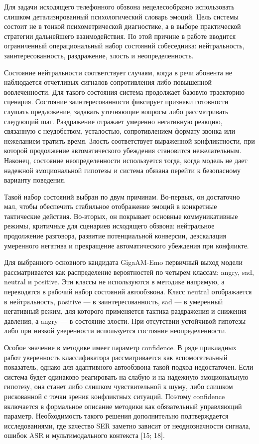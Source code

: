 \documentclass[a4paper,14pt]{extarticle}
\renewcommand{\texttt}[1]{\textnormal{#1}}
\begin{document}
Для задачи исходящего телефонного обзвона нецелесообразно использовать
слишком детализированный психологический словарь эмоций. Цель системы
состоит не в тонкой психометрической диагностике, а в выборе
практической стратегии дальнейшего взаимодействия. По этой причине в
работе вводится ограниченный операциональный набор состояний
собеседника: нейтральность, заинтересованность, раздражение, злость и
неопределенность.

Состояние нейтральности соответствует случаям, когда в речи абонента не
наблюдается отчетливых сигналов сопротивления либо повышенной
вовлеченности. Для такого состояния система продолжает базовую
траекторию сценария. Состояние заинтересованности фиксирует признаки
готовности слушать предложение, задавать уточняющие вопросы либо
рассматривать следующий шаг. Раздражение отражает умеренно негативную
реакцию, связанную с неудобством, усталостью, сопротивлением формату
звонка или нежеланием тратить время. Злость соответствует выраженной
конфликтности, при которой продолжение автоматического убеждения
становится нежелательным. Наконец, состояние неопределенности
используется тогда, когда модель не дает надежной эмоциональной гипотезы
и система обязана перейти к безопасному варианту поведения.

Такой набор состояний выбран по двум причинам. Во-первых, он достаточно
мал, чтобы обеспечить стабильное отображение эмоций в конкретные
тактические действия. Во-вторых, он покрывает основные коммуникативные
режимы, критичные для сценариев исходящего обзвона: нейтральное
продолжение разговора, развитие потенциальной конверсии, деэскалация
умеренного негатива и прекращение автоматического убеждения при
конфликте.

Для выбранного основного кандидата \texttt{GigaAM-Emo} первичный выход
модели рассматривается как распределение вероятностей по четырем
классам: \texttt{angry}, \texttt{sad}, \texttt{neutral} и
\texttt{positive}. Эти классы не используются в методике напрямую, а
переводятся в рабочий набор состояний автообзвона. Класс
\texttt{neutral} отображается в нейтральность, \texttt{positive} --- в
заинтересованность, \texttt{sad} --- в умеренный негативный режим, для
которого применяется тактика раздражения и снижения давления, а
\texttt{angry} --- в состояние злости. При отсутствии устойчивой
гипотезы либо при низкой уверенности используется состояние
неопределенности.

Особое значение в методике имеет параметр \texttt{confidence}. В ряде
прикладных работ уверенность классификатора рассматривается как
вспомогательный показатель, однако для адаптивного автообзвона такой
подход недостаточен. Если система будет одинаково реагировать на слабую
и на надежную эмоциональную гипотезу, она станет либо слишком
чувствительной к шуму, либо слишком рискованной с точки зрения
конфликтных ситуаций. Поэтому \texttt{confidence} включается в
формальное описание методики как обязательный управляющий параметр.
Необходимость такого решения дополнительно подтверждается
исследованиями, где качество SER заметно зависит от неоднозначности
сигнала, ошибок ASR и мультимодального контекста {[}15; 18{]}.
\end{document}
